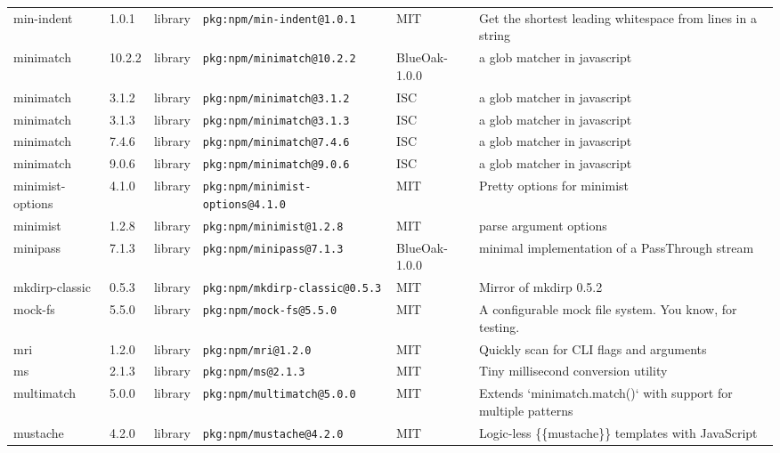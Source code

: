 \documentclass[11pt,a4paper]{article}
\begin{document}
\begin{longtable}{|p{4cm}|p{2cm}|p{1.6cm}|p{5cm}|p{1.5cm}|p{3.5cm}|}
\raggedright min-indent & 1.0.1 & library & \small\texttt{pkg:npm/min-indent@1.0.1} & MIT & \small Get the shortest leading whitespace from lines in a string \\
\raggedright minimatch & 10.2.2 & library & \small\texttt{pkg:npm/minimatch@10.2.2} & BlueOak-1.0.0 & \small a glob matcher in javascript \\
\raggedright minimatch & 3.1.2 & library & \small\texttt{pkg:npm/minimatch@3.1.2} & ISC & \small a glob matcher in javascript \\
\raggedright minimatch & 3.1.3 & library & \small\texttt{pkg:npm/minimatch@3.1.3} & ISC & \small a glob matcher in javascript \\
\raggedright minimatch & 7.4.6 & library & \small\texttt{pkg:npm/minimatch@7.4.6} & ISC & \small a glob matcher in javascript \\
\raggedright minimatch & 9.0.6 & library & \small\texttt{pkg:npm/minimatch@9.0.6} & ISC & \small a glob matcher in javascript \\
\raggedright minimist-options & 4.1.0 & library & \small\texttt{pkg:npm/minimist-options@4.1.0} & MIT & \small Pretty options for minimist \\
\raggedright minimist & 1.2.8 & library & \small\texttt{pkg:npm/minimist@1.2.8} & MIT & \small parse argument options \\
\raggedright minipass & 7.1.3 & library & \small\texttt{pkg:npm/minipass@7.1.3} & BlueOak-1.0.0 & \small minimal implementation of a PassThrough stream \\
\raggedright mkdirp-classic & 0.5.3 & library & \small\texttt{pkg:npm/mkdirp-classic@0.5.3} & MIT & \small Mirror of mkdirp 0.5.2 \\
\raggedright mock-fs & 5.5.0 & library & \small\texttt{pkg:npm/mock-fs@5.5.0} & MIT & \small A configurable mock file system.  You know, for testing. \\
\raggedright mri & 1.2.0 & library & \small\texttt{pkg:npm/mri@1.2.0} & MIT & \small Quickly scan for CLI flags and arguments \\
\raggedright ms & 2.1.3 & library & \small\texttt{pkg:npm/ms@2.1.3} & MIT & \small Tiny millisecond conversion utility \\
\raggedright multimatch & 5.0.0 & library & \small\texttt{pkg:npm/multimatch@5.0.0} & MIT & \small Extends `minimatch.match()` with support for multiple patterns \\
\raggedright mustache & 4.2.0 & library & \small\texttt{pkg:npm/mustache@4.2.0} & MIT & \small Logic-less \{\{mustache\}\} templates with JavaScript \\

\end{longtable}
\end{document}

